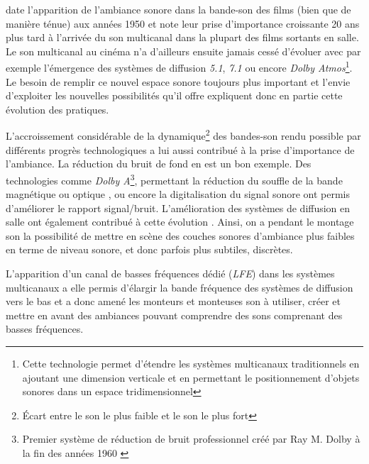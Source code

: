 ﻿\documentclass[12pt]{article}
\begin{document}
\textcite{adjiman_usages_2018} date l'apparition de l'ambiance sonore dans la bande-son des films (bien que de manière ténue) aux années 1950 et note leur prise d'importance croissante 20 ans plus tard à l'arrivée du son multicanal dans la plupart des films sortants en salle. Le son multicanal au cinéma n'a d'ailleurs ensuite jamais cessé d'évoluer avec par exemple l'émergence des systèmes de diffusion \textit{5.1}, \textit{7.1} ou encore \textit{Dolby Atmos}\footnote{Cette technologie permet d'étendre les systèmes multicanaux traditionnels en ajoutant une dimension verticale et en permettant le positionnement d'objets sonores dans un espace tridimensionnel}. Le besoin de remplir ce nouvel espace sonore toujours plus important et l'envie d'exploiter les nouvelles possibilités qu'il offre expliquent donc en partie cette évolution des pratiques.

L'accroissement considérable de la dynamique\footnote{Écart entre le son le plus faible et le son le plus fort} des bandes-son rendu possible par différents progrès technologiques a lui aussi contribué à la prise d'importance de l'ambiance. La réduction du bruit de fond en est un bon exemple. Des technologies comme \textit{Dolby A}\footnote{Premier système de réduction de bruit professionnel créé par Ray M. Dolby à la fin des années 1960 \parencite{de_nanteuil_dictionnaire_2008}}, permettant la réduction du souffle de la bande magnétique ou optique \parencite{denizart_lemergence_2017}, ou encore la digitalisation du signal sonore \parencite{adjiman_usages_2018} ont permis d'améliorer le rapport signal/bruit. L'amélioration des systèmes de diffusion en salle ont également contribué à cette évolution \parencite{adjiman_usages_2018}. Ainsi, on a pendant le montage son la possibilité de mettre en scène des couches sonores d'ambiance plus faibles en terme de niveau sonore, et donc parfois plus subtiles, discrètes.

L'apparition d'un canal de basses fréquences dédié (\textit{LFE}) dans les systèmes multicanaux a elle permis d'élargir la bande fréquence des systèmes de diffusion vers le bas \parencite{denizart_lemergence_2017} et a donc amené les monteurs et monteuses son à utiliser, créer et mettre en avant des ambiances pouvant comprendre des sons comprenant des basses fréquences.
\end{document}
